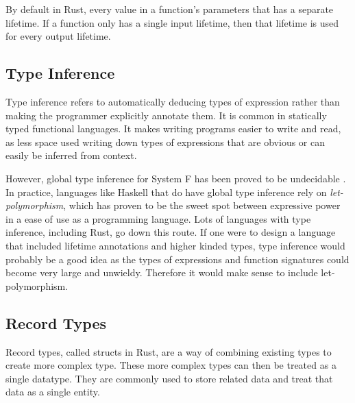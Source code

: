 By default in Rust, every value in a function's parameters that has a separate
lifetime. If a function only has a single input lifetime, then that lifetime is
used for every output lifetime.

\subsection{Type Inference}
Type inference refers to automatically deducing types of expression rather than
making the programmer explicitly annotate them. It is common in statically
typed functional languages. It makes writing programs easier to write and read,
as less space used writing down types of expressions that are obvious or can
easily be inferred from context.

However, global type inference for System F has been proved to be undecidable
\cite{tapl} \cite{attapl}. In practice, languages like Haskell that do have
global type inference rely on \textit{let-polymorphism}, which has proven to be
the sweet spot between expressive power in a ease of use as a programming
language. Lots of languages with type inference, including Rust, go down this
route. If one were to design a language that included lifetime annotations and
higher kinded types, type inference would probably be a good idea as the types
of expressions and function signatures could become very large and unwieldy.
Therefore it would make sense to include let-polymorphism.

\subsection{Record Types}
Record types, called structs in Rust, are a way of combining existing types to
create more complex type. These more complex types can then be treated as a
single datatype. They are commonly used to store related data and treat that
data as a single entity.

